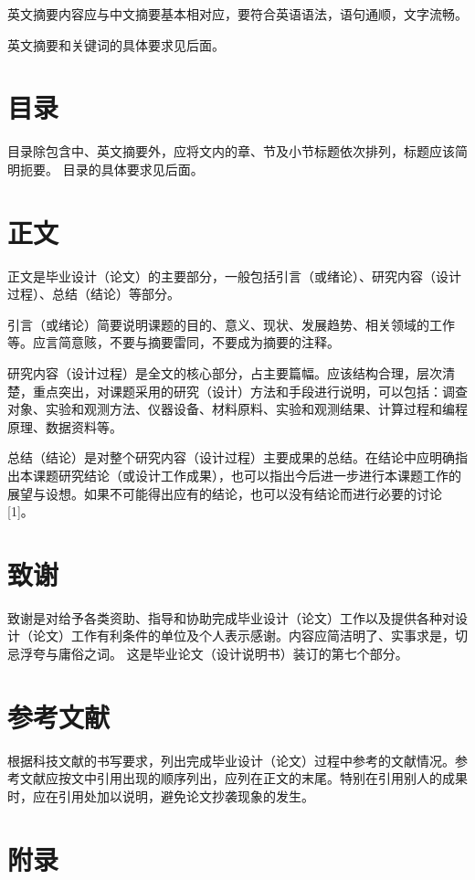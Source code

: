 英文摘要内容应与中文摘要基本相对应，要符合英语语法，语句通顺，文字流畅。

英文摘要和关键词的具体要求见后面。

\section{目录}

目录除包含中、英文摘要外，应将文内的章、节及小节标题依次排列，标题应该简明扼要。
目录的具体要求见后面。

\section{正文}
正文是毕业设计（论文）的主要部分，一般包括引言（或绪论）、研究内容（设计过程）、总结（结论）等部分。

引言（或绪论）简要说明课题的目的、意义、现状、发展趋势、相关领域的工作等。应言简意赅，不要与摘要雷同，不要成为摘要的注释。

研究内容（设计过程）是全文的核心部分，占主要篇幅。应该结构合理，层次清楚，重点突出，对课题采用的研究（设计）方法和手段进行说明，可以包括：调查对象、实验和观测方法、仪器设备、材料原料、实验和观测结果、计算过程和编程原理、数据资料等。

总结（结论）是对整个研究内容（设计过程）主要成果的总结。在结论中应明确指出本课题研究结论（或设计工作成果），也可以指出今后进一步进行本课题工作的展望与设想。如果不可能得出应有的结论，也可以没有结论而进行必要的讨论[1]。

\section{致谢}

致谢是对给予各类资助、指导和协助完成毕业设计（论文）工作以及提供各种对设计（论文）工作有利条件的单位及个人表示感谢。内容应简洁明了、实事求是，切忌浮夸与庸俗之词。
这是毕业论文（设计说明书）装订的第七个部分。

\section{参考文献}

根据科技文献的书写要求，列出完成毕业设计（论文）过程中参考的文献情况。参考文献应按文中引用出现的顺序列出，应列在正文的末尾。特别在引用别人的成果时，应在引用处加以说明，避免论文抄袭现象的发生。

\section{附录}

